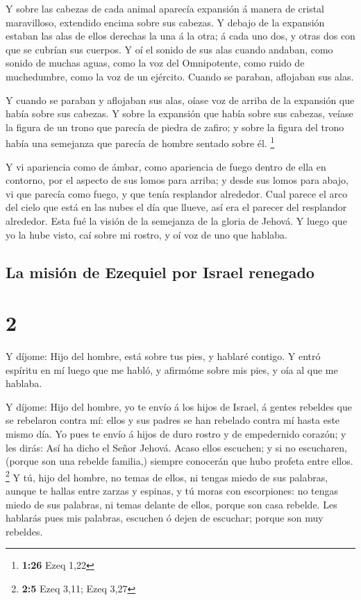  Y sobre las cabezas de cada animal aparecía expansión á
manera de cristal maravilloso, extendido encima sobre sus cabezas.
 Y debajo de la expansión estaban las alas de ellos
derechas la una á la otra; á cada uno dos, y otras dos con que se
cubrían sus cuerpos.  Y oí el sonido de sus alas cuando
andaban, como sonido de muchas aguas, como la voz del Omnipotente, como
ruido de muchedumbre, como la voz de un ejército. Cuando se paraban,
aflojaban sus alas.

 Y cuando se paraban y aflojaban sus alas, oíase voz de
arriba de la expansión que había sobre sus cabezas.  Y
sobre la expansión que había sobre sus cabezas, veíase la figura de un
trono que parecía de piedra de zafiro; y sobre la figura del trono había
una semejanza que parecía de hombre sentado sobre él. \footnote{\textbf{1:26}
  Ezeq 1,22}

 Y vi apariencia como de ámbar, como apariencia de fuego
dentro de ella en contorno, por el aspecto de sus lomos para arriba; y
desde sus lomos para abajo, vi que parecía como fuego, y que tenía
resplandor alrededor.  Cual parece el arco del cielo que
está en las nubes el día que llueve, así era el parecer del resplandor
alrededor. Esta fué la visión de la semejanza de la gloria de Jehová. Y
luego que yo la hube visto, caí sobre mi rostro, y oí voz de uno que
hablaba.

\hypertarget{la-misiuxf3n-de-ezequiel-por-israel-renegado}{%
\subsection{La misión de Ezequiel por Israel
renegado}\label{la-misiuxf3n-de-ezequiel-por-israel-renegado}}

\hypertarget{section-1}{%
\section{2}\label{section-1}}

 Y díjome: Hijo del hombre, está sobre tus pies, y hablaré
contigo.  Y entró espíritu en mí luego que me habló, y
afirmóme sobre mis pies, y oía al que me hablaba.

 Y díjome: Hijo del hombre, yo te envío á los hijos de
Israel, á gentes rebeldes que se rebelaron contra mí: ellos y sus padres
se han rebelado contra mí hasta este mismo día.  Yo pues te
envío á hijos de duro rostro y de empedernido corazón; y les dirás: Así
ha dicho el Señor Jehová.  Acaso ellos escuchen; y si no
escucharen, (porque son una rebelde familia,) siempre conocerán que hubo
profeta entre ellos. \footnote{\textbf{2:5} Ezeq 3,11; Ezeq 3,27}
 Y tú, hijo del hombre, no temas de ellos, ni tengas miedo
de sus palabras, aunque te hallas entre zarzas y espinas, y tú moras con
escorpiones: no tengas miedo de sus palabras, ni temas delante de ellos,
porque son casa rebelde.  Les hablarás pues mis palabras,
escuchen ó dejen de escuchar; porque son muy rebeldes.

